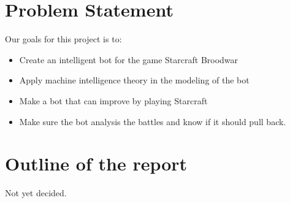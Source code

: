 \section{Problem Statement}
	Our goals for this project is to:
	\begin{itemize}
		\item Create an intelligent bot for the game Starcraft Broodwar
		\item Apply machine intelligence theory in the modeling of the bot
		\item Make a bot that can improve by playing Starcraft
		\item Make sure the bot analysis the battles and know if it should pull back.
		
	\end{itemize}

\section{Outline of the report}
	Not yet decided.